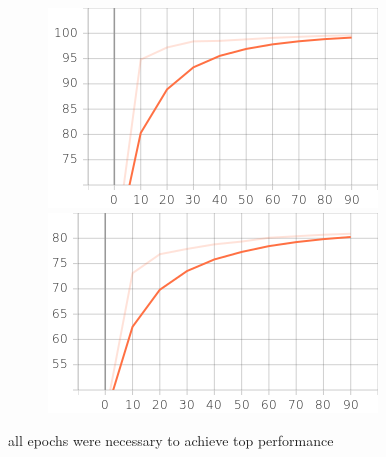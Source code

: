 \documentclass{article}
\begin{document}
\begin{figure}
\centering
\begin{minipage}{.5\textwidth}
  \centering
  \includegraphics[width=.9\linewidth]{result_files/train_accuracy_2.png}
\end{minipage}%
\begin{minipage}{.5\textwidth}
  \centering
  \includegraphics[width=.9\linewidth]{result_files/test_accuracy_2.png}

\end{minipage}
\end{figure}

all epochs were necessary to achieve top performance
\end{document}

